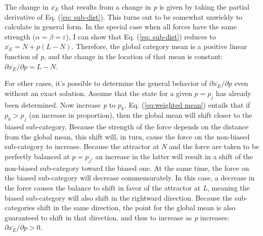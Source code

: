 The change in $\overline{x_{E}}$ that results from a change in \emph{p}
is given by taking the partial derivative of Eq. (\ref{eq: sub-dist}).
This turns out to be somewhat unwieldy to calculate in general form.
In the special case when all forces have the same strength ($\alpha=\beta=\varepsilon$),
I can show that Eq. (\ref{eq: sub-dist}) reduces to $\overline{x_{E}}=N+p(L-N)$.
Therefore, the global category mean is a positive linear function
of \emph{p}, and the change in the location of that mean is constant:
${\partial\overline{x_{E}}}/{\partial p}=L-N$. 

For other cases, it's possible to determine the general behavior of
${\partial\overline{x_{E}}}/{\partial p}$ even without an exact
solution. Assume that the  state for a given $p=p_{j}$
has already been determined. Now increase \emph{p} to $p_{k}$. Eq.
(\ref{eq:weighted mean}) entails that if $p_{k}>p_{j}$ (an increase
in  proportion), then the global mean will shift closer to the
biased sub-category. Because the strength of the  force
depends on the distance from the global mean, this shift will, in
turn, cause the  force on the non-biased sub-category
to increase. Because the attractor at \emph{N} and the 
force are taken to be perfectly balanced at $p=p_{j}$, an increase
in the latter will result in a shift of the non-biased sub-category
toward the biased one. At the same time, the  force on
the biased sub-category will decrease commensurately. In this case,
a decrease in the  force causes the balance to shift in
favor of the attractor at \emph{L}, meaning the biased sub-category
will also shift in the rightward direction. Because the sub-categories
shift in the same direction, the  point for the global
mean is also guaranteed to shift in that direction, and thus to increase
as \emph{p} increases: ${\partial\overline{x_{E}}}/{\partial p}>0$. 

